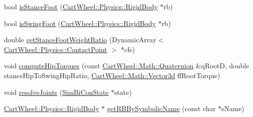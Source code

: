 \begin{DoxyCompactItemize}
\item 
bool \hyperlink{classCartWheel_1_1Core_1_1SimBiController_a7f1a872f10bd7aaa236212a7f5143786}{isStanceFoot} (\hyperlink{classCartWheel_1_1Physics_1_1RigidBody}{CartWheel::Physics::RigidBody} $\ast$rb)
\item 
bool \hyperlink{classCartWheel_1_1Core_1_1SimBiController_a5729956eba2d47c641de667feaa8182c}{isSwingFoot} (\hyperlink{classCartWheel_1_1Physics_1_1RigidBody}{CartWheel::Physics::RigidBody} $\ast$rb)
\item 
double \hyperlink{classCartWheel_1_1Core_1_1SimBiController_ab2d20ea4062b83c047d93ffc99ad2b34}{getStanceFootWeightRatio} (DynamicArray$<$ \hyperlink{classCartWheel_1_1Physics_1_1ContactPoint}{CartWheel::Physics::ContactPoint} $>$ $\ast$cfs)
\item 
void \hyperlink{classCartWheel_1_1Core_1_1SimBiController_a5ee2b35043a54eecc824527cc1a1a575}{computeHipTorques} (const \hyperlink{classCartWheel_1_1Math_1_1Quaternion}{CartWheel::Math::Quaternion} \&qRootD, double stanceHipToSwingHipRatio, \hyperlink{classCartWheel_1_1Math_1_1Vector3d}{CartWheel::Math::Vector3d} ffRootTorque)
\item 
void \hyperlink{classCartWheel_1_1Core_1_1SimBiController_a788b1c8702161ce7c9b3e4b424277543}{resolveJoints} (\hyperlink{classCartWheel_1_1Core_1_1SimBiConState}{SimBiConState} $\ast$state)
\item 
\hyperlink{classCartWheel_1_1Physics_1_1RigidBody}{CartWheel::Physics::RigidBody} $\ast$ \hyperlink{classCartWheel_1_1Core_1_1SimBiController_a97252e3cc62ec9dbcf4c79c5a89d9678}{getRBBySymbolicName} (const char $\ast$sName)
\end{DoxyCompactItemize}

